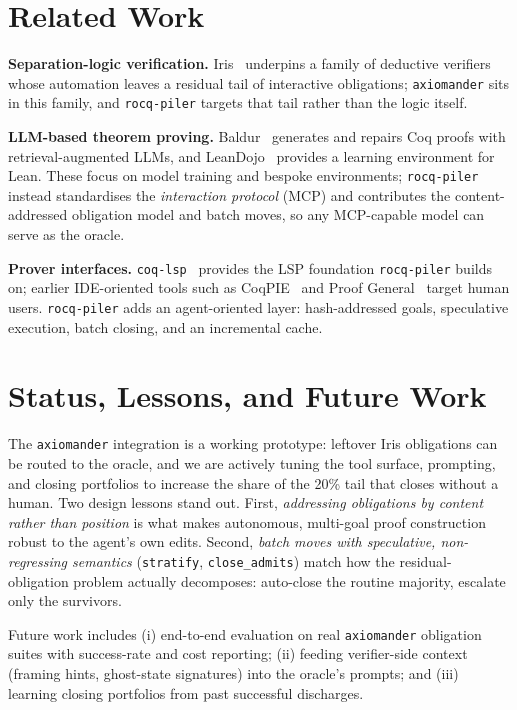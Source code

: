 \documentclass[11pt,a4paper]{article}
\newcommand{\tool}{\texttt{rocq-piler}\xspace}
\newcommand{\axm}{\texttt{axiomander}\xspace}
\begin{document}
\section{Related Work}

\textbf{Separation-logic verification.} Iris~\cite{jung2018iris} underpins a
family of deductive verifiers whose automation leaves a residual tail of
interactive obligations; \axm sits in this family, and \tool targets that tail
rather than the logic itself.

\textbf{LLM-based theorem proving.} Baldur~\cite{first2023baldur} generates and
repairs Coq proofs with retrieval-augmented LLMs, and
LeanDojo~\cite{yang2023leandojo} provides a learning environment for Lean. These
focus on model training and bespoke environments; \tool instead standardises the
\emph{interaction protocol} (MCP) and contributes the content-addressed
obligation model and batch moves, so any MCP-capable model can serve as the
oracle.

\textbf{Prover interfaces.} \texttt{coq-lsp}~\cite{gallego2022coqlsp} provides
the LSP foundation \tool builds on; earlier IDE-oriented tools such as
CoqPIE~\cite{roe2016coqpie} and Proof General~\cite{aspinall2000proof} target
human users. \tool adds an agent-oriented layer: hash-addressed goals,
speculative execution, batch closing, and an incremental cache.

\section{Status, Lessons, and Future Work}

The \axm integration is a working prototype: leftover Iris obligations can be
routed to the oracle, and we are actively tuning the tool surface, prompting,
and closing portfolios to increase the share of the 20\% tail that closes
without a human. Two design lessons stand out. First, \emph{addressing
obligations by content rather than position} is what makes autonomous,
multi-goal proof construction robust to the agent's own edits. Second,
\emph{batch moves with speculative, non-regressing semantics}
(\texttt{stratify}, \texttt{close\_admits}) match how the residual-obligation
problem actually decomposes: auto-close the routine majority, escalate only the
survivors.

Future work includes (i) end-to-end evaluation on real \axm obligation suites
with success-rate and cost reporting; (ii) feeding verifier-side context (framing
hints, ghost-state signatures) into the oracle's prompts; and (iii) learning
closing portfolios from past successful discharges.
\end{document}
